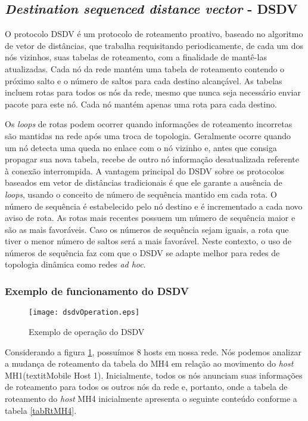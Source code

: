 \subsection{\textit{Destination sequenced distance vector} - DSDV} 
O protocolo DSDV \'e um protocolo de roteamento proativo\cite{gorantala}, baseado no algoritmo de vetor de dist\^ancias, que trabalha requisitando periodicamente, de cada um dos n\'os vizinhos, suas tabelas de roteamento, com a finalidade de mant\^e-las atualizadas. 
Cada n\'o da rede mant\'em uma tabela de roteamento contendo o pr\'oximo salto e o n\'umero de saltos para cada destino alcan\c{c}\'avel. 
As tabelas incluem rotas para todos os n\'os da rede, mesmo que nunca seja necess\'ario enviar pacote para este n\'o. 
Cada n\'o mant\'em apenas uma rota para cada destino.

Os \textit{loops} de rotas podem ocorrer quando informa\c{c}\~oes de roteamento incorretas s\~ao mantidas na rede ap\'os uma troca de topologia. 
Geralmente ocorre quando um n\'o detecta uma queda no enlace com o n\'o vizinho e, antes que consiga propagar sua nova tabela, recebe de outro n\'o informa\c{c}\~ao desatualizada referente \`a conex\~ao interrompida. 
A vantagem principal do DSDV sobre os protocolos baseados em vetor de dist\^ancias tradicionais \'e que ele garante a aus\^encia de \textit{loops}, usando o conceito de n\'umero de sequ\^encia mantido em cada rota. 
O n\'umero de sequ\^encia \'e estabelecido pelo n\'o destino e \'e incrementado a cada novo aviso de rota.
As rotas mais recentes possuem um n\'umero de sequ\^encia maior e s\~ao as mais favor\'aveis. 
Caso os n\'umeros de sequ\^encia sejam iguais, a rota que tiver o menor n\'umero de saltos ser\'a a mais favor\'avel. 
Neste contexto, o uso de n\'umeros de sequ\^encia faz com que o DSDV se adapte melhor para redes de topologia din\^amica como redes \textit{ad hoc}.

\subsubsection{Exemplo de funcionamento do DSDV}
\begin{figure}[H]
	\centering
	\texttt{[image: dsdvOperation.eps]}
	\caption{Exemplo de opera\c{c}\~ ao do DSDV}
	\label{figOpDSDV}
\end{figure}

Considerando a figura \ref{figOpDSDV}, possu\'imos 8 hosts em nossa rede. 
N\'os podemos analizar a mudan\c{c}a de roteamento da tabela do MH4 em rela\c{c}\~ao ao movimento do \textit{host} MH1(textit{Mobile Host 1}). 
Inicialmente, todos os n\'os anunciam suas informa\c{c}\~oes de roteamento para todos os outros n\'os da rede e, portanto, onde a tabela de roteamento do \textit{host} MH4 inicialmente apresenta o seguinte conte\'udo conforme a tabela \ref{tabRtMH4}.

